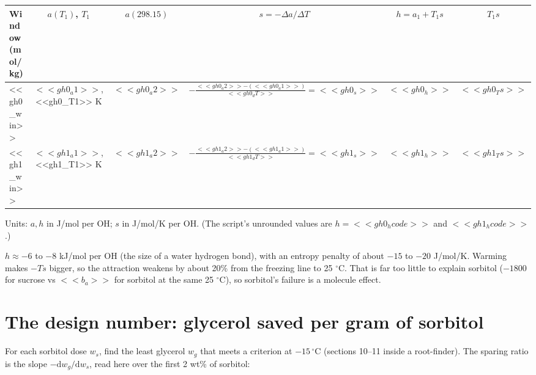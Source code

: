 \documentclass[11pt,a4paper]{article}
\begin{document}
\begin{center}\small
\begin{tabular}{l c c c c c}
\toprule
Window (mol/kg) & $a(T_1)$, $T_1$ & $a(298.15)$ & $s=-\Delta a/\Delta T$ & $h=a_1+T_1s$ & $T_1 s$\\
\midrule
<<gh0_win>> & $<<gh0_a1>>$, <<gh0_T1>> K & $<<gh0_a2>>$ & $-\frac{<<gh0_a2>>-(<<gh0_a1>>)}{<<gh0_dT>>}=<<gh0_s>>$ & $<<gh0_h>>$ & $<<gh0_Ts>>$\\
<<gh1_win>> & $<<gh1_a1>>$, <<gh1_T1>> K & $<<gh1_a2>>$ & $-\frac{<<gh1_a2>>-(<<gh1_a1>>)}{<<gh1_dT>>}=<<gh1_s>>$ & $<<gh1_h>>$ & $<<gh1_Ts>>$\\
\bottomrule
\end{tabular}
\end{center}
Units: $a,h$ in J/mol per OH; $s$ in J/mol/K per OH. (The script's unrounded values are $h=<<gh0_hcode>>$ and $<<gh1_hcode>>$.)
\begin{result}
$h\approx-6$ to $-8$ kJ/mol per OH (the size of a water hydrogen bond), with an entropy penalty of about $-15$ to $-20$
J/mol/K. Warming makes $-Ts$ bigger, so the attraction weakens by about 20\% from the freezing line to 25 $^\circ$C. That
is far too little to explain sorbitol ($-1800$ for sucrose vs $<<b_a>>$ for sorbitol at the same 25 $^\circ$C), so sorbitol's
failure is a molecule effect.
\end{result}

\section{The design number: glycerol saved per gram of sorbitol}
For each sorbitol dose $w_s$, find the least glycerol $w_g$ that meets a criterion at $-15\,^\circ$C (sections 10--11 inside
a root-finder). The sparing ratio is the slope $-\mathrm{d}w_g/\mathrm{d}w_s$, read here over the first 2 wt\% of sorbitol:
\end{document}
